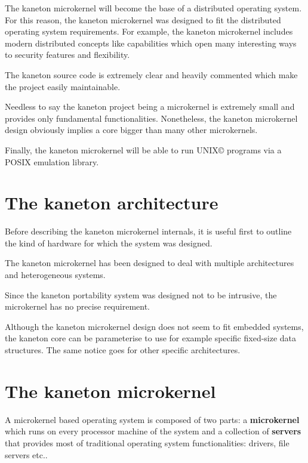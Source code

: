 {\begin{multicols}{2}
The kaneton microkernel will become the base of a distributed operating
system. For this reason, the kaneton microkernel was designed to fit
the distributed operating system requirements. For example, the kaneton
microkernel includes modern distributed concepts like capabilities
which open many interesting ways to security features and flexibility.

The kaneton source code is extremely clear and heavily commented which
make the project easily maintainable.

Needless to say the kaneton project being a microkernel is extremely small
and provides only fundamental functionalities. Nonetheless, the kaneton
microkernel design obviously implies a core bigger than many other
microkernels.

Finally, the kaneton microkernel will be able to run
UNIX{\scriptsize \copyright} programs via a POSIX emulation library.

%
%

\section{The kaneton architecture}

Before describing the kaneton microkernel internals, it is useful first to
outline the kind of hardware for which the system was designed.

The kaneton microkernel has been designed to deal with multiple architectures
and heterogeneous systems.

Since the kaneton portability system was designed not to be intrusive, the
microkernel has no precise requirement.

Although the kaneton microkernel design does not seem to fit embedded
systems, the kaneton core can be parameterise to use for example specific
fixed-size data structures. The same notice goes for other specific
architectures.

%
%

\section{The kaneton microkernel}

A microkernel based operating system is composed of two parts:
a \textbf{microkernel} which runs on every processor machine of the system
and a collection of \textbf{servers} that provides most of traditional
operating system functionalities: drivers, file servers etc..


\end{multicols}}
